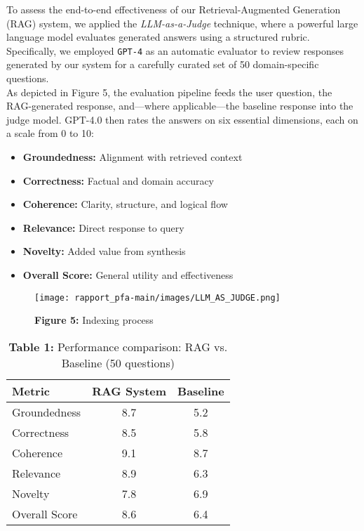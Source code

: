 To assess the end-to-end effectiveness of our Retrieval-Augmented Generation (RAG) system, we applied the \textit{LLM-as-a-Judge} technique, where a powerful large language model evaluates generated answers using a structured rubric. Specifically, we employed \texttt{GPT-4} as an automatic evaluator to review responses generated by our system for a carefully curated set of 50 domain-specific questions.\\
As depicted in Figure 5, the evaluation pipeline feeds the user question, the RAG-generated response, and—where applicable—the baseline response into the judge model. GPT-4.0 then rates the answers on six essential dimensions, each on a scale from 0 to 10:
\begin{itemize}
    \item \textbf{Groundedness:} Alignment with retrieved context
    \item \textbf{Correctness:} Factual and domain accuracy
    \item \textbf{Coherence:} Clarity, structure, and logical flow
    \item \textbf{Relevance:} Direct response to query
    \item \textbf{Novelty:} Added value from synthesis
    \item \textbf{Overall Score:} General utility and effectiveness
\end{itemize}
\begin{figure}[htbp]
  \centering
  \texttt{[image: rapport\_pfa-main/images/LLM\_AS\_JUDGE.png]}
  \caption*{\textbf{Figure 5:} Indexing process} %
  \label{fig:indexing-process-manual}
\end{figure}

\begin{table}[h]
    \centering
    \begin{tabular}{lcc}
        \toprule
        \textbf{Metric} & \textbf{RAG System} & \textbf{Baseline} \\
        \midrule
        Groundedness & 8.7 & 5.2 \\
        Correctness & 8.5 & 5.8 \\
        Coherence & 9.1 & 8.7 \\
        Relevance & 8.9 & 6.3 \\
        Novelty & 7.8 & 6.9 \\
        Overall Score & 8.6 & 6.4 \\
        \bottomrule
    \end{tabular}
    \caption*{\textbf{Table 1:} Performance comparison: RAG vs. Baseline (50 questions)}
    \label{tab:rag-vs-baseline}
\end{table}

